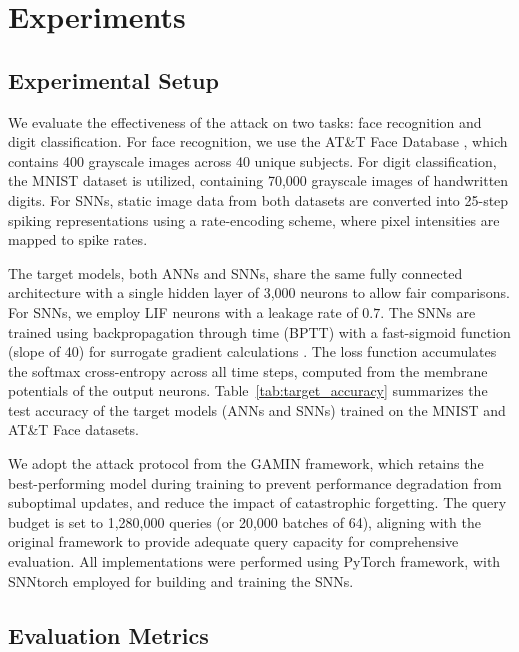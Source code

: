 \section{Experiments}
\label{sec:experiments}

\subsection{Experimental Setup}



\noindent
We evaluate the effectiveness of the attack on two tasks: face recognition and digit classification. For face recognition, we use the AT\&T Face Database \cite{samaria1994orl}, which contains 400 grayscale images across 40 unique subjects. For digit classification, the MNIST \cite{deng2012mnist} dataset is utilized, containing 70,000 grayscale images of handwritten digits. For SNNs, static image data from both datasets are converted into 25-step spiking representations using a rate-encoding scheme, where pixel intensities are mapped to spike rates.


The target models, both ANNs and SNNs, share the same fully connected architecture with a single hidden layer of 3,000 neurons to allow fair comparisons. For SNNs, we employ LIF neurons with a leakage rate of $0.7$. The SNNs are trained using backpropagation through time (BPTT) \cite{bellec2018long} with a fast-sigmoid function (slope of 40) for surrogate gradient calculations \cite{neftci2019surrogate}. The loss function accumulates the softmax cross-entropy across all time steps, computed from the membrane potentials of the output neurons. Table~\ref{tab:target_accuracy} summarizes the test accuracy of the target models (ANNs and SNNs) trained on the MNIST and AT\&T Face datasets. 

We adopt the attack protocol from the GAMIN framework, which retains the best-performing model during training to prevent performance degradation from suboptimal updates, and reduce the impact of catastrophic forgetting.
The query budget is set to 1,280,000 queries (or 20,000 batches of 64), aligning with the original framework to provide adequate query capacity for comprehensive evaluation. All implementations were performed using PyTorch \cite{paszke2019pytorch} framework, with SNNtorch \cite{eshraghian2023training} employed for building and training the SNNs. 




\subsection{Evaluation Metrics}


